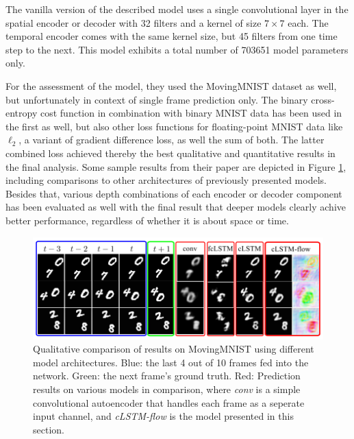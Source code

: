 The vanilla version of the described model uses a single convolutional layer in the spatial encoder or decoder with \num{32} filters and a kernel of size $7 \times 7$ each. The temporal encoder comes with the same kernel size, but \num{45} filters from one time step to the next. This model exhibits a total number of \num{703651} model parameters only. 

For the assessment of the model, they used the MovingMNIST dataset as well, but unfortunately in context of single frame prediction only. The binary cross-entropy cost function in combination with binary MNIST data has been used in the first as well, but also other loss functions for floating-point MNIST data like $\ell_2$, a variant of gradient difference loss, as well the sum of both. The latter combined loss achieved thereby the best qualitative and quantitative results in the final analysis. Some sample results from their paper are depicted in Figure \ref{fig:spatiotemp_results}, including comparisons to other architectures of previously presented models. Besides that, various depth combinations of each encoder or decoder component has been evaluated as well with the final result that deeper models clearly achive better performance, regardless of whether it is about space or time.

\begin{figure}[htb]
	\centering
	\includegraphics[width=1.0\linewidth]{figures/related/spat_temp_results.png} 
	\caption[Qualitative MovingMNIST Results of LSTM Models]{Qualitative comparison of results on MovingMNIST using different model architectures. Blue: the last 4 out of 10 frames fed into the network. Green: the next frame's ground truth. Red: Prediction results on various models in comparison, where \textit{conv} is a simple convolutional autoencoder that handles  each frame as a seperate input channel, and \textit{cLSTM-flow} is the model presented in this section.} \label{fig:spatiotemp_results}
\end{figure}

